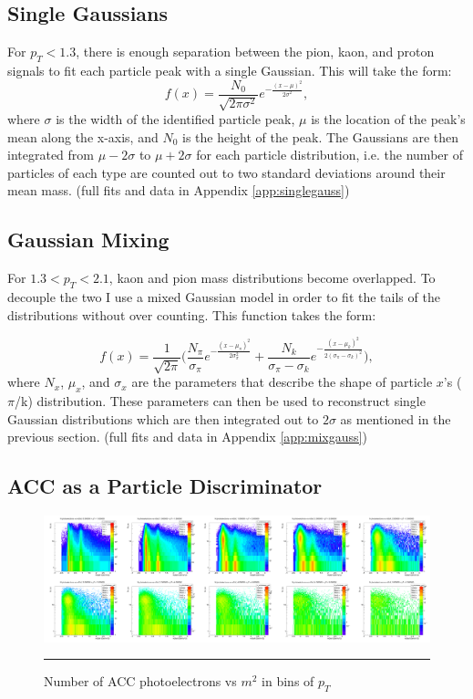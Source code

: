 \subsection{Single Gaussians}
For $p_T< 1.3$, there is enough separation between the pion, kaon, and proton signals to fit each particle peak with a single Gaussian. This will take the form:
\begin{equation}
f(x) = \frac{N_0}{\sqrt{2\pi \sigma^2}} e^{-\frac{(x-\mu)^2}{2\sigma^{2}}},
\end{equation}
where $\sigma$ is the width of the identified particle peak, $\mu$ is the location of the peak's mean along the x-axis, and $N_0$ is the height of the peak. The Gaussians are then integrated from $\mu-2\sigma$ to $\mu+2\sigma$ for each particle distribution, i.e. the number of particles of each type are counted out to two standard deviations around their mean mass. (full fits and data in Appendix \ref{app:singlegauss})

\subsection{Gaussian Mixing}
For $1.3<p_T<2.1$, kaon and pion mass distributions become overlapped. To decouple the two I use a mixed Gaussian model in order to fit the tails of the distributions without over counting. This function takes the form:

\begin{equation}
f(x) = \frac{1}{\sqrt{2\pi}} \bigg( \frac{N_{\pi}}{\sigma_{\pi}} e^{-\frac{(x-\mu_{\pi})^2}{2\sigma_{\pi}^{2}}} + \frac{N_{k}}{\sigma_{\pi}-\sigma_{k}} e^{-\frac{(x-\mu_{k})^2}{2(\sigma_{\pi} - \sigma_{k})^{2}}} \bigg),
\end{equation}
where $N_{x}$, $\mu_x$, and $\sigma_x$ are the parameters that describe the shape of particle $x$'s ($\pi$/k) distribution. These parameters can then be used to reconstruct single Gaussian distributions which are then integrated out to $2\sigma$ as mentioned in the previous section.
(full fits and data in Appendix \ref{app:mixgauss})

\subsection{ACC as a Particle Discriminator}
\hspace{-1cm}
\begin{figure}[htbp!]
  \centering
    \includegraphics[width=1\textwidth]{hiptfits/nphotvsm2.jpg}
    \rule{35em}{0.5pt}
  \caption[Number of ACC photoelectrons vs $m^2$ in bins of $p_T$]{Number of ACC photoelectrons vs $m^2$ in bins of $p_T$}
  \label{fig:accspread}
\end{figure}

